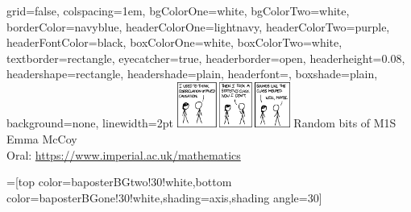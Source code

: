 \documentclass[portrait,final,a0paper]{baposter}
\begin{document}
\newlength{\leftimgwidth}
\begin{poster}%
  {
  grid=false,
  colspacing=1em,
  bgColorOne=white,
  bgColorTwo=white,
  borderColor=navyblue,
  headerColorOne=lightnavy,
  headerColorTwo=purple,
  headerFontColor=black,
  boxColorOne=white,
  boxColorTwo=white,
  textborder=rectangle,
  eyecatcher=true,
  headerborder=open,
  headerheight=0.08\textheight,
  headershape=rectangle,
  headershade=plain,
  headerfont=\Large\textsf, %
  boxshade=plain,
  background=none,
  linewidth=2pt
  }
  {\includegraphics[width=10em]{correlation}} %
  {\sf %
  Random bits of M1S}
  {\sf %
  \vspace{1em} Emma McCoy\\
	Oral:  \url{https://www.imperial.ac.uk/mathematics}
  }
  {%
  }

  =[top color=baposterBGtwo!30!white,bottom color=baposterBGone!30!white,shading=axis,shading angle=30]

     \setlength{\leftimgwidth}{0.78em+8.0em}


\end{poster}
\end{document}
